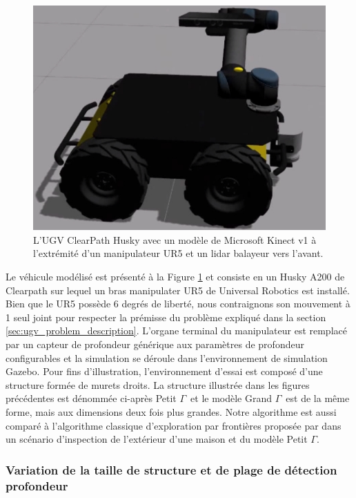 \begin{figure}[h]
  \centering
  \includegraphics[width=0.5\linewidth]{images/ugv_gazebo_husky.jpg}
  \caption[L'UGV utilisé lors des simulations]{L'UGV ClearPath Husky avec un modèle de Microsoft Kinect v1 à l'extrémité d'un manipulateur UR5 et un lidar balayeur vers l'avant.}
  \label{fig:ugv_gazebo_husky}
\end{figure}

Le véhicule modélisé est présenté à la Figure \ref{fig:ugv_gazebo_husky} et consiste en un Husky A200 de Clearpath sur lequel un bras manipulater UR5 de Universal Robotics est installé. Bien que le UR5 possède 6 degrés de liberté, nous contraignons son mouvement à 1 seul joint pour respecter la prémisse du problème expliqué dans la section \ref{sec:ugv_problem_description}. L'organe terminal du manipulateur est remplacé par un capteur de profondeur générique aux paramètres de profondeur configurables et la simulation se déroule dans l'environnement de simulation Gazebo. Pour fins d'illustration, l'environnement d'essai est composé d'une structure formée de murets droits. La structure illustrée dans les figures précédentes est dénommée ci-après \guillemotleft Petit $\Gamma$\guillemotright\ et le modèle \guillemotleft Grand $\Gamma$\guillemotright\ est de la même forme, mais aux dimensions deux fois plus grandes. Notre algorithme est aussi comparé à l'algorithme classique d'exploration par frontières proposée par \cite{Yamauchi1997} dans un scénario d'inspection de l'extérieur d'une maison et du modèle Petit $\Gamma$.

\subsubsection{Variation de la taille de structure et de plage de détection profondeur}


